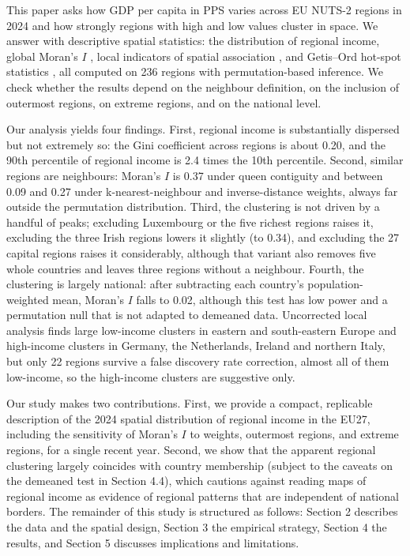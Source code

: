 \documentclass[11pt]{article}
\begin{document}
This paper asks how GDP per capita in PPS varies across EU NUTS-2 regions in 2024 and how strongly regions with high and low values cluster in space. We answer with descriptive spatial statistics: the distribution of regional income, global Moran's $I$ \citep{moran1950notes}, local indicators of spatial association \citep{anselin1995local}, and Getis--Ord hot-spot statistics \citep{getis1992analysis}, all computed on 236 regions with permutation-based inference. We check whether the results depend on the neighbour definition, on the inclusion of outermost regions, on extreme regions, and on the national level.

Our analysis yields four findings. First, regional income is substantially dispersed but not extremely so: the Gini coefficient across regions is about 0.20, and the 90th percentile of regional income is 2.4 times the 10th percentile. Second, similar regions are neighbours: Moran's $I$ is 0.37 under queen contiguity and between 0.09 and 0.27 under k-nearest-neighbour and inverse-distance weights, always far outside the permutation distribution. Third, the clustering is not driven by a handful of peaks; excluding Luxembourg or the five richest regions raises it, excluding the three Irish regions lowers it slightly (to 0.34), and excluding the 27 capital regions raises it considerably, although that variant also removes five whole countries and leaves three regions without a neighbour. Fourth, the clustering is largely national: after subtracting each country's population-weighted mean, Moran's $I$ falls to 0.02, although this test has low power and a permutation null that is not adapted to demeaned data. Uncorrected local analysis finds large low-income clusters in eastern and south-eastern Europe and high-income clusters in Germany, the Netherlands, Ireland and northern Italy, but only 22 regions survive a false discovery rate correction, almost all of them low-income, so the high-income clusters are suggestive only.

Our study makes two contributions. First, we provide a compact, replicable description of the 2024 spatial distribution of regional income in the EU27, including the sensitivity of Moran's $I$ to weights, outermost regions, and extreme regions, for a single recent year. Second, we show that the apparent regional clustering largely coincides with country membership (subject to the caveats on the demeaned test in Section 4.4), which cautions against reading maps of regional income as evidence of regional patterns that are independent of national borders. The remainder of this study is structured as follows: Section 2 describes the data and the spatial design, Section 3 the empirical strategy, Section 4 the results, and Section 5 discusses implications and limitations.
\end{document}
